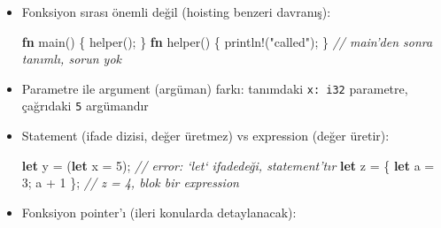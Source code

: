\documentclass[12pt,a4paper]{article}
\newenvironment{Shaded}{}{}
\newcommand{\CommentTok}[1]{\textcolor[rgb]{0.38,0.63,0.69}{\textit{#1}}}
\newcommand{\DataTypeTok}[1]{\textcolor[rgb]{0.56,0.13,0.00}{#1}}
\newcommand{\DecValTok}[1]{\textcolor[rgb]{0.25,0.63,0.44}{#1}}
\newcommand{\FunctionTok}[1]{\textcolor[rgb]{0.02,0.16,0.49}{#1}}
\newcommand{\KeywordTok}[1]{\textcolor[rgb]{0.00,0.44,0.13}{\textbf{#1}}}
\newcommand{\NormalTok}[1]{#1}
\newcommand{\OperatorTok}[1]{\textcolor[rgb]{0.40,0.40,0.40}{#1}}
\newcommand{\StringTok}[1]{\textcolor[rgb]{0.25,0.44,0.63}{#1}}
\begin{document}
\begin{itemize}
\begin{Shaded}
\begin{Highlighting}[]
\KeywordTok{fn} \FunctionTok{log}\OperatorTok{(}\NormalTok{msg}\OperatorTok{:} \OperatorTok{\&}\DataTypeTok{str}\OperatorTok{)} \OperatorTok{\{}\NormalTok{ println}\OperatorTok{!(}\StringTok{"\{msg\}"}\OperatorTok{);} \OperatorTok{\}}   \CommentTok{// -\textgreater{} () yazmaya gerek yok}
\end{Highlighting}
\end{Shaded}


  Hata: gövdede değer varsa ama \texttt{-\textgreater{}} yoksa:

\begin{Shaded}
\begin{Highlighting}[]
\KeywordTok{fn} \FunctionTok{f}\OperatorTok{()} \OperatorTok{\{} \DecValTok{5} \OperatorTok{\}}
\CommentTok{// E0308: mismatched types, expected `()`, found integer}
\end{Highlighting}
\end{Shaded}
\item
  Fonksiyon sırası önemli değil (hoisting benzeri davranış):

\begin{Shaded}
\begin{Highlighting}[]
\KeywordTok{fn} \FunctionTok{main}\OperatorTok{()} \OperatorTok{\{} \FunctionTok{helper}\OperatorTok{();} \OperatorTok{\}}
\KeywordTok{fn} \FunctionTok{helper}\OperatorTok{()} \OperatorTok{\{}\NormalTok{ println}\OperatorTok{!(}\StringTok{"called"}\OperatorTok{);} \OperatorTok{\}}   \CommentTok{// main'den sonra tanımlı, sorun yok}
\end{Highlighting}
\end{Shaded}
\item
  Parametre ile argument (argüman) farkı: tanımdaki \texttt{x:\ i32} parametre, çağrıdaki \texttt{5} argümandır
\item
  Statement (ifade dizisi, değer üretmez) vs expression (değer üretir):

\begin{Shaded}
\begin{Highlighting}[]
\KeywordTok{let}\NormalTok{ y }\OperatorTok{=} \OperatorTok{(}\KeywordTok{let}\NormalTok{ x }\OperatorTok{=} \DecValTok{5}\OperatorTok{);}   \CommentTok{// error: `let` ifadedeği, statement'tır}
\KeywordTok{let}\NormalTok{ z }\OperatorTok{=} \OperatorTok{\{} \KeywordTok{let}\NormalTok{ a }\OperatorTok{=} \DecValTok{3}\OperatorTok{;}\NormalTok{ a }\OperatorTok{+} \DecValTok{1} \OperatorTok{\};}   \CommentTok{// z = 4, blok bir expression}
\end{Highlighting}
\end{Shaded}
\item
  Fonksiyon pointer'ı (ileri konularda detaylanacak):


\end{itemize}
\end{document}
